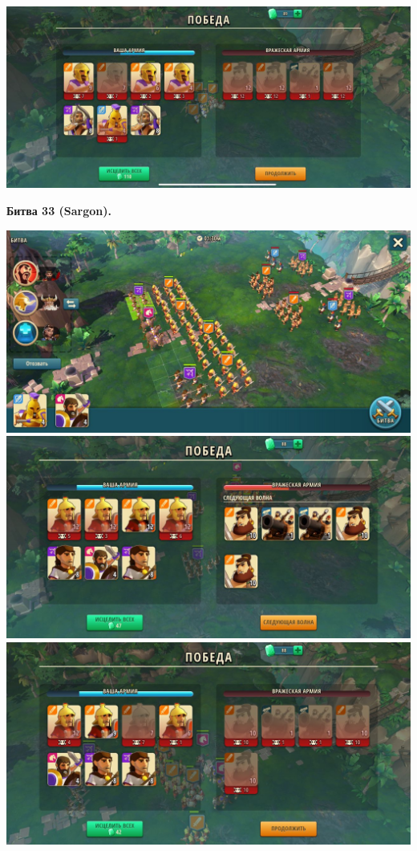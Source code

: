 \noindent\includegraphics[width=\linewidth]{./parts/media/TreasureHunt/32/decoder/photo_2022-04-07_10-01-57.jpg} \newline

\newpage
\begin{center}
	\hypertarget{fight33}{\textbf{Битва 33 (Sargon).}}
\end{center}
\noindent\includegraphics[width=\linewidth]{./parts/media/TreasureHunt/33/sargon/photo_2022-04-07_10-06-22.jpg} \newline
\noindent\includegraphics[width=\linewidth]{./parts/media/TreasureHunt/33/sargon/photo_2022-04-07_10-06-34.jpg} \newline
\noindent\includegraphics[width=\linewidth]{./parts/media/TreasureHunt/33/sargon/photo_2022-04-07_10-06-40.jpg} \newline
